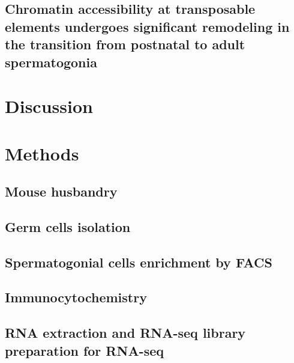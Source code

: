 \documentclass[12pt,twoside]{reedthesis}
\begin{document}
\hypertarget{chromatin-accessibility-at-transposable-elements-undergoes-significant-remodeling-in-the-transition-from-postnatal-to-adult-spermatogonia}{%
\subsection{Chromatin accessibility at transposable elements undergoes significant remodeling in the transition from postnatal to adult spermatogonia}\label{chromatin-accessibility-at-transposable-elements-undergoes-significant-remodeling-in-the-transition-from-postnatal-to-adult-spermatogonia}}

\newpage

\hypertarget{discussion}{%
\section{Discussion}\label{discussion}}

\newpage

\hypertarget{methods-1}{%
\section{Methods}\label{methods-1}}

\hypertarget{mouse-husbandry}{%
\subsection{Mouse husbandry}\label{mouse-husbandry}}

\hypertarget{germ-cells-isolation}{%
\subsection{Germ cells isolation}\label{germ-cells-isolation}}

\hypertarget{spermatogonial-cells-enrichment-by-facs}{%
\subsection{Spermatogonial cells enrichment by FACS}\label{spermatogonial-cells-enrichment-by-facs}}

\hypertarget{immunocytochemistry}{%
\subsection{Immunocytochemistry}\label{immunocytochemistry}}

\hypertarget{rna-extraction-and-rna-seq-library-preparation-for-rna-seq}{%
\subsection{RNA extraction and RNA-seq library preparation for RNA-seq}\label{rna-extraction-and-rna-seq-library-preparation-for-rna-seq}}
\end{document}
